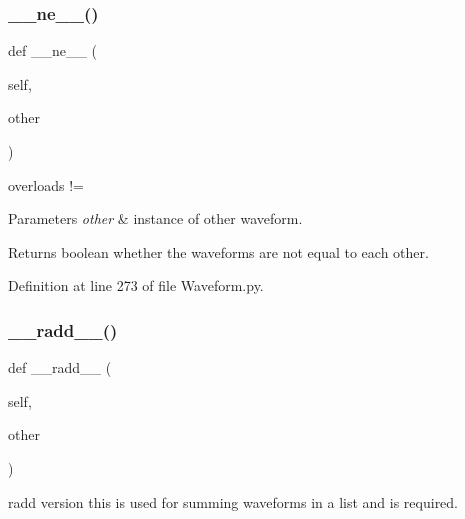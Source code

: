 \subsubsection{\texorpdfstring{\+\_\+\+\_\+ne\+\_\+\+\_\+()}{\_\_ne\_\_()}}
{\footnotesize\ttfamily def \+\_\+\+\_\+ne\+\_\+\+\_\+ (\begin{DoxyParamCaption}\item[{}]{self,  }\item[{}]{other }\end{DoxyParamCaption})}



overloads != 


\begin{DoxyParams}{Parameters}
{\em other} & instance of other waveform. \\
\hline
\end{DoxyParams}
\begin{DoxyReturn}{Returns}
boolean whether the waveforms are not equal to each other. 
\end{DoxyReturn}


Definition at line 273 of file Waveform.\+py.

\mbox{\label{classSignalIntegrity_1_1TimeDomain_1_1Waveform_1_1Waveform_1_1Waveform_a2e098fa2cfaf8d1874cf417836a3329e}} 
\subsubsection{\texorpdfstring{\+\_\+\+\_\+radd\+\_\+\+\_\+()}{\_\_radd\_\_()}}
{\footnotesize\ttfamily def \+\_\+\+\_\+radd\+\_\+\+\_\+ (\begin{DoxyParamCaption}\item[{}]{self,  }\item[{}]{other }\end{DoxyParamCaption})}



radd version this is used for summing waveforms in a list and is required. 


